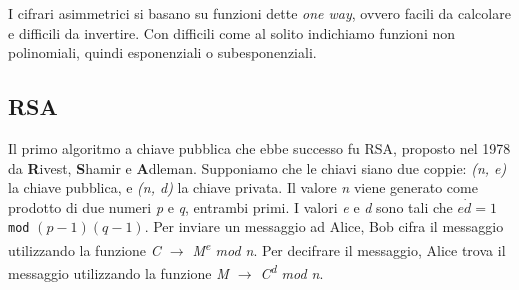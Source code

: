 I cifrari asimmetrici si basano su funzioni dette \textit{one way}, ovvero facili da calcolare e difficili da invertire. Con difficili come al solito indichiamo funzioni non polinomiali, quindi esponenziali o subesponenziali.

 

\subsection{RSA}
Il primo algoritmo a chiave pubblica che ebbe successo fu RSA, proposto nel 1978 da \textbf{R}ivest, \textbf{S}hamir e \textbf{A}dleman. Supponiamo che le chiavi siano due coppie: \textit{(n, e)} la chiave pubblica, e \textit{(n, d)} la chiave privata. Il valore \textit{n} viene generato come prodotto di due numeri \textit{p} e \textit{q}, entrambi primi. I valori \textit{e} e \textit{d} sono tali che $e \dot d = 1$ \texttt{mod} $(p-1)(q-1)$. 
Per inviare un messaggio ad Alice, Bob cifra il messaggio utilizzando la funzione \textit{C $\rightarrow$ M\textsuperscript{e} mod n}. Per decifrare il messaggio, Alice trova il messaggio utilizzando la funzione \textit{M $\rightarrow$ C\textsuperscript{d} mod n}. 

